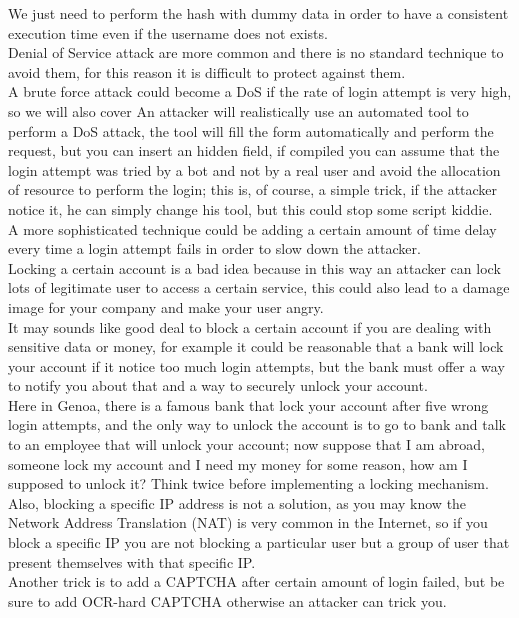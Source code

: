 We just need to perform the hash with dummy data in order to have a consistent execution time even if the username does not exists.\\
Denial of Service attack are more common and there is no standard technique to avoid them, for this reason it is difficult to protect against them.\\
A brute force attack could become a DoS if the rate of login attempt is very high, so we will also cover 
An attacker will realistically use an automated tool to perform a DoS attack, the tool will fill the form automatically and perform the request, but you can insert an hidden field, if compiled you can assume that the login attempt was tried by a bot and not by a real user and avoid the allocation of resource to perform the login; this is, of course, a simple trick, if the attacker notice it, he can simply change his tool, but this could stop some script kiddie.\\
A more sophisticated technique could be adding a certain amount of time delay every time a login attempt fails in order to slow down the attacker.\\
Locking a certain account is a bad idea because in this way an attacker can lock lots of legitimate user to access a certain service, this could also lead to a damage image for your company and make your user angry.\\
It may sounds like good deal to block a certain account if you are dealing with sensitive data or money, for example it could be reasonable that a bank will lock your account if it notice too much login attempts, but the bank must offer a way to notify you about that and a way to securely unlock your account.\\
Here in Genoa, there is a famous bank that lock your account after five wrong login attempts, and the only way to unlock the account is to go to bank and talk to an employee that will unlock your account; now suppose that I am abroad, someone lock my account and I need my money for some reason, how am I supposed to unlock it?
Think twice before implementing a locking mechanism. \\

Also, blocking a specific IP address is not a solution, as you may know the Network Address Translation (NAT) is very common in the Internet, so if you block a specific IP you are not blocking a particular user but a group of user that present themselves with that specific IP.\\
Another trick is to add a CAPTCHA after certain amount of login failed, but be sure to add OCR-hard CAPTCHA otherwise an attacker can trick you.\\

